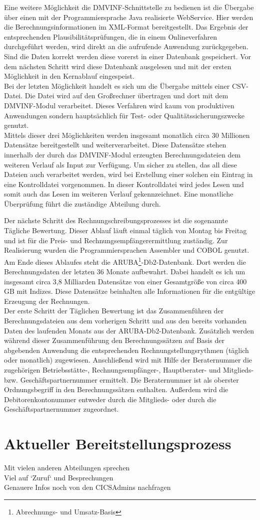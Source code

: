 Eine weitere Möglichkeit die DMVINF-Schnittstelle zu bedienen ist die Übergabe über einen mit der Programmiersprache Java realisierte WebService.
Hier werden die Berechnungsinformationen im XML-Format bereitgestellt.
Das Ergebnis der entsprechenden Plausibilitätsprüfungen, die in einem Onlineverfahren durchgeführt werden, wird direkt an die aufrufende Anwendung zurückgegeben.
Sind die Daten korrekt werden diese vorerst in einer Datenbank gespeichert.
Vor dem nächsten Schritt wird diese Datenbank ausgelesen und mit der ersten Möglichkeit in den Kernablauf eingespeist. \\
Bei der letzten Möglichkeit handelt es sich um die Übergabe mittels einer CSV-Datei.
Die Datei wird auf den Großrechner übertragen und dort mit dem DMVINF-Modul verarbeitet.
Dieses Verfahren wird kaum von produktiven Anwendungen sondern hauptsächlich für Test- oder Qualitätssicherungszwecke genutzt.\\
Mittels dieser drei Möglichkeiten werden insgesamt monatlich circa 30 Millionen Datensätze bereitgestellt und weiterverarbeitet.
Diese Datensätze stehen innerhalb der durch das DMVINF-Modul erzeugten Berechnungsdateien dem weiteren Verlauf als Input zur Verfügung.
Um sicher zu stellen, das all diese Dateien auch verarbeitet werden, wird bei Erstellung einer solchen ein Eintrag in eine Kontrolldatei vorgenommen.
In dieser Kontrolldatei wird jedes Lesen und somit auch das Lesen im weiteren Verlauf gekennzeichnet.
Eine monatliche Überprüfung führt die zuständige Abteilung durch.

Der nächste Schritt des Rechnungschreibungsprozesses ist die sogenannte Tägliche Bewertung.
Dieser Ablauf läuft einmal täglich von Montag bis Freitag und ist für die Preis- und Rechnungsempfängerermittlung zuständig.
Zur Realisierung wurden die Programmiersprachen Assembler und COBOL genutzt.
Am Ende dieses Ablaufes steht die ARUBA\footnote{Abrechnungs- und Umsatz-Basis}-Db2-Datenbank.
Dort werden die Berechnungsdaten der letzten 36 Monate aufbewahrt.
Dabei handelt es ich um insgesamt circa 3,8 Milliarden Datensätze von einer Gesamtgröße von circa 400 GB mit Indizes.
Diese Datensätze beinhalten alle Informationen für die entgültige Erzeugung der Rechnungen.\\
Der erste Schritt der Täglichen Bewertung ist das Zusammenführen der Berechnungsdateien aus dem vorherigen Schritt und aus den bereits vorhanden Daten des laufenden Monats aus der ARUBA-Db2-Datenbank.
Zusätzlich werden während dieser Zusammenführung den Berechnungssätzen auf Basis der abgebenden Anwendung die entsprechenden Rechnungstellungsrythmen (täglich oder monatlich) zugewiesen.
Anschließend wird mit Hilfe der Beraternummer die zugehörigen Betriebsstätte-, Rechnungsempfänger-, Hauptberater- und Mitglieds- bzw. Geschäftspartnernummer ermittelt.
Die Beraternummer ist als oberster Ordnungsbegriff in den Berechnungssätzen enthalten.
Außerdem wird die Debitorenkontonummer entweder durch die Mitglieds- oder durch die Geschäftspartnernummer zugeordnet.




\section{Aktueller Bereitstellungsprozess}
Mit vielen anderen Abteilungen sprechen\\
Viel auf `Zuruf` und Besprechungen\\
Genauere Infos noch von den CICSAdmins nachfragen\\

 